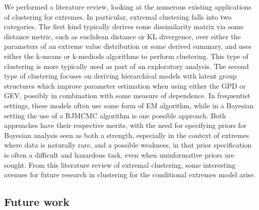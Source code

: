 \documentclass{article}
\numberwithin{equation}{section}
\begin{document}
We performed a literature review, looking at the numerous existing applications of clustering for extremes.
In particular, extremal clustering falls into two categories.
The first kind typically derives some dissimilarity matrix via some distance metric, such as euclidean distance or KL divergence, over either the parameters of an extreme value distribution or some derived summary, and uses either the k-means or k-mediods algorithms to perform clustering. 
This type of clustering is more typically used as part of an exploratory analysis. 
The second type of clustering focuses on deriving hierarchical models with latent group structures which improve parameter estimation when using either the GPD or GEV, possibly in combination with some measure of dependence.
In frequentist settings, these models often use some form of EM algorithm, while in a Bayesian setting the use of a RJMCMC algorithm is one possible approach.
Both approaches have their respective merits, with the need for specifying priors for Bayesian analysis seen as both a strength, especially in the context of extremes where data is naturally rare, and a possible weakness, in that prior specification is often a difficult and hazardous task, even when uninformative priors are sought. 
From this literature review of extremal clustering, some interesting avenues for future research in clustering for the conditional extremes model arise. 


\subsection{Future work}
\end{document}
